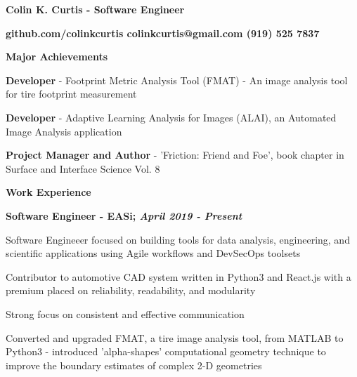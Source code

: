 \documentclass[letterpaper,final]{memoir}
\newcommand{\LargeSep}{\vspace{1.3em}}
\newcommand{\Sep}{\vspace{1.0em}}
\newcommand{\SmallSep}{\vspace{0.4em}}
\newcommand{\CVSection}[1]
	{\LARGE\textbf{#1}\par
	\SmallSep\normalsize}
\newcommand{\CVItem}[1]
	{\textbf{\color{Blue} #1}}
\newcommand\tab[1][1cm]{\hspace*{#1}}
\begin{document}
\Huge \bfseries {\color{Blue} Colin K. Curtis - Software Engineer}

\Sep
\normalsize\normalfont

\CVItem  \tab \bfseries {github.com/colinkcurtis \tab colinkcurtis@gmail.com  \tab  (919) 525 7837}

\LargeSep


\notoserif \CVSection{Major Achievements}
\normalfont

\Sep

\begin{compactitem}

    \item \textbf{Developer} - Footprint Metric Analysis Tool (FMAT) - An image analysis tool for tire footprint measurement
    \SmallSep

    \item \textbf{Developer} - Adaptive Learning Analysis for Images (ALAI), an Automated Image Analysis application
    \SmallSep

    \item \textbf{Project Manager and Author} - 'Friction: Friend and Foe', book chapter in Surface and Interface Science Vol. 8


\end{compactitem}
\LargeSep


\notoserif \CVSection{Work Experience}
\normalfont
\Sep
\CVItem{Software Engineer - EASi; \textit{April 2019 - Present}}
\begin{compactitem}[\color{Blue}$\circ$]
    \SmallSep
    \item Software Engineeer focused on building tools for data analysis, engineering, and scientific applications using Agile workflows and DevSecOps toolsets
    \SmallSep
    \item  Contributor to automotive CAD system written in Python3 and React.js with a premium placed on reliability, readability, and modularity
    \SmallSep
    \item Strong focus on consistent and effective communication
    \SmallSep
    \item Converted and upgraded FMAT, a tire image analysis tool, from MATLAB to Python3 - introduced
    \newline
    'alpha-shapes' computational geometry technique to improve the boundary estimates of complex 2-D geometries
    \SmallSep
\end{compactitem}
\end{document}
